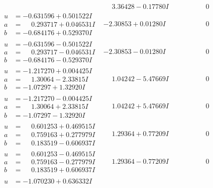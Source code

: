 \documentclass[1p]{elsarticle_modified}
\theoremstyle{definition}
\begin{document}
$$\begin{array}{c|c|c}
 & \phantom{-}3.36428 - 0.17780 I & \phantom{-0.000000 } 0 \\ \hline\begin{aligned}
u &= -0.631596 + 0.501522 I \\
a &= \phantom{-}0.293717 + 0.046531 I \\
b &= -0.684176 + 0.529370 I\end{aligned}
 & -2.30853 + 0.01280 I & \phantom{-0.000000 } 0 \\ \hline\begin{aligned}
u &= -0.631596 - 0.501522 I \\
a &= \phantom{-}0.293717 - 0.046531 I \\
b &= -0.684176 - 0.529370 I\end{aligned}
 & -2.30853 - 0.01280 I & \phantom{-0.000000 } 0 \\ \hline\begin{aligned}
u &= -1.217270 + 0.004425 I \\
a &= \phantom{-}1.30064 - 2.33815 I \\
b &= -1.07297 + 1.32920 I\end{aligned}
 & \phantom{-}1.04242 - 5.47669 I & \phantom{-0.000000 } 0 \\ \hline\begin{aligned}
u &= -1.217270 - 0.004425 I \\
a &= \phantom{-}1.30064 + 2.33815 I \\
b &= -1.07297 - 1.32920 I\end{aligned}
 & \phantom{-}1.04242 + 5.47669 I & \phantom{-0.000000 } 0 \\ \hline\begin{aligned}
u &= \phantom{-}0.601253 + 0.469515 I \\
a &= \phantom{-}0.759163 + 0.277979 I \\
b &= \phantom{-}0.183519 - 0.606937 I\end{aligned}
 & \phantom{-}1.29364 + 0.77209 I & \phantom{-0.000000 } 0 \\ \hline\begin{aligned}
u &= \phantom{-}0.601253 - 0.469515 I \\
a &= \phantom{-}0.759163 - 0.277979 I \\
b &= \phantom{-}0.183519 + 0.606937 I\end{aligned}
 & \phantom{-}1.29364 - 0.77209 I & \phantom{-0.000000 } 0 \\ \hline\begin{aligned}
u &= -1.070230 + 0.636332 I \\

\end{aligned}
\end{array}$$
\end{document}
